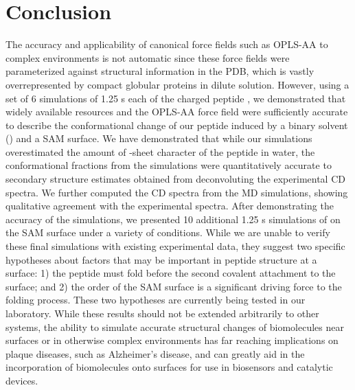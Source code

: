 \section{Conclusion}

The accuracy and applicability of canonical force fields such as OPLS-AA to complex environments is not automatic since these force fields were parameterized against structural information in the PDB, which is vastly overrepresented by compact globular proteins in dilute solution. 
However, using a set of 6 simulations of 1.25 \textmu{}s each of the charged peptide \pep{}, we demonstrated that widely available resources and the OPLS-AA force field were sufficiently accurate to describe the conformational change of our peptide induced by a binary solvent (\tbawat{}) and a SAM surface. 
We have demonstrated that while our simulations overestimated the amount of \textbeta{}-sheet character of the peptide in water, the conformational fractions from the simulations were quantitatively accurate to secondary structure estimates obtained from deconvoluting the experimental CD spectra. 
We further computed the CD spectra from the MD simulations, showing qualitative agreement with the experimental spectra. 
After demonstrating the accuracy of the simulations, we presented 10 additional 1.25 \textmu{}s simulations of \pep{} on the SAM surface under a variety of conditions. 
While we are unable to verify these final simulations with existing experimental data, they suggest two specific hypotheses about factors that may be important in peptide structure at a surface: 
1) the peptide must fold before the second covalent attachment to the surface; and 
2) the order of the SAM surface is a significant driving force to the folding process. 
These two hypotheses are currently being tested in our laboratory. 
While these results should not be extended arbitrarily to other systems, the ability to simulate accurate structural changes of biomolecules near surfaces or in otherwise complex environments has far reaching implications on plaque diseases, such as Alzheimer's disease, and can greatly aid in the incorporation of biomolecules onto surfaces for use in biosensors and catalytic devices. 



